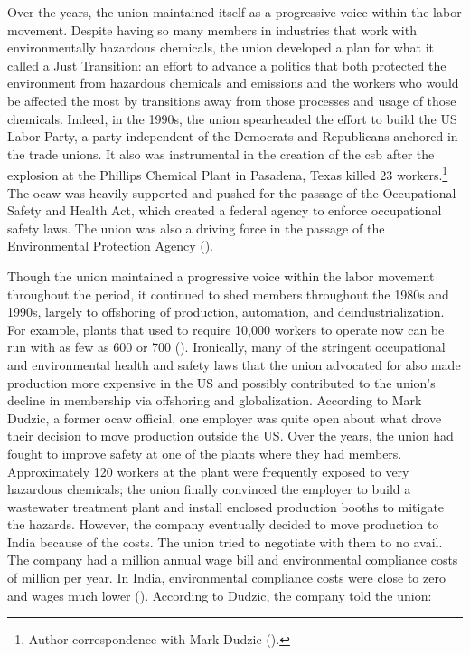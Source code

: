 \documentclass[12pt]{article}
\begin{document}
Over the years, the union maintained itself as a progressive voice within the labor movement. Despite having so many members in industries that work with environmentally hazardous chemicals, the union developed a plan for what it called a Just Transition: an effort to advance a politics that both protected the environment from hazardous chemicals and emissions and the workers who would be affected the most by transitions away from those processes and usage of those chemicals. Indeed, in the 1990s, the union spearheaded the effort to build the US Labor Party, a party independent of the Democrats and Republicans anchored in the trade unions. It also was instrumental in the creation of the \acrfull{csb} after the explosion at the Phillips Chemical Plant in Pasadena, Texas killed 23 workers.\footnote{Author correspondence with Mark Dudzic (\citeyear{dudzicInterview2024}).} The \acrshort{ocaw} was heavily supported and pushed for the passage of the Occupational Safety and Health Act, which created a federal agency to enforce occupational safety laws. The union was also a driving force in the passage of the Environmental Protection Agency (\cite{leopoldManWhoHated2007}).

Though the union maintained a progressive voice within the labor movement throughout the period, it continued to shed members throughout the 1980s and 1990s, largely to offshoring of production, automation, and deindustrialization. For example, plants that used to require 10,000 workers to operate now can be run with as few as 600 or 700 (\cite{dudzicInterview2024}). Ironically, many of the stringent occupational and environmental health and safety laws that the union advocated for also made production more expensive in the US and possibly contributed to the union’s decline in membership via offshoring and globalization. According to Mark Dudzic, a former \acrshort{ocaw} official, one employer was quite open about what drove their decision to move production outside the US. Over the years, the union had fought to improve safety at one of the plants where they had members. Approximately 120 workers at the plant were frequently exposed to very hazardous chemicals; the union finally convinced the employer to build a wastewater treatment plant and install enclosed production booths to mitigate the hazards. However, the company eventually decided to move production to India because of the costs. The union tried to negotiate with them to no avail. The company had a   million annual wage bill and environmental compliance costs of   million per year. In India, environmental compliance costs were close to zero and wages much lower (\cite{dudzicInterview2024}). According to Dudzic, the company told the union:
\end{document}
